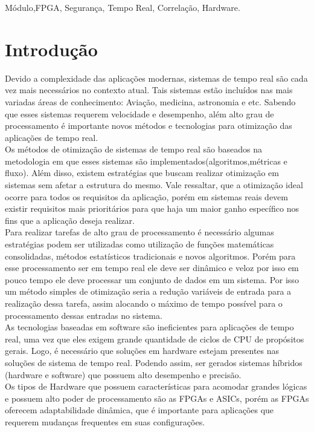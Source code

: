 \documentclass[conference]{IEEEtran}
\begin{document}
	
	\renewcommand{\IEEEkeywordsname}{Palavras-chave}
	\begin{IEEEkeywords}
		Módulo,FPGA, Segurança, Tempo Real, Correlação, Hardware.
	\end{IEEEkeywords}
	
	\section{Introdução}
	
	
Devido a complexidade das aplicações modernas, sistemas de tempo real são cada vez mais necessários no contexto atual. Tais sistemas estão incluídos nas mais variadas áreas de conhecimento: Aviação, medicina, astronomia e etc. Sabendo que esses sistemas requerem velocidade e desempenho, além alto grau de processamento é importante novos métodos e tecnologias para otimização das aplicações de tempo real.\\
Os métodos de otimização de sistemas de tempo real são baseados na metodologia em que esses sistemas são implementados(algoritmos,métricas e fluxo). Além disso, existem estratégias que buscam realizar otimização em sistemas sem afetar a estrutura do mesmo. Vale ressaltar, que a otimização ideal ocorre para todos os requisitos da aplicação, porém em sistemas reais devem existir requisitos mais prioritários para que haja um maior ganho específico nos fins que a aplicação deseja realizar.\\
Para realizar tarefas de alto grau de processamento é necessário algumas estratégias podem ser utilizadas como utilização de funções matemáticas consolidadas, métodos estatísticos tradicionais e novos algoritmos. Porém para esse processamento ser em tempo real ele deve ser dinâmico e veloz por isso em pouco tempo ele deve processar um conjunto de dados em um sistema. Por isso um método simples de otimização seria a redução variáveis de entrada para a realização dessa tarefa, assim alocando o máximo de tempo possível para o processamento dessas entradas no sistema.\\
As tecnologias baseadas em software são ineficientes para aplicações de tempo real, uma vez que eles exigem grande quantidade de ciclos de CPU de propósitos gerais. Logo, é necessário que soluções em hardware estejam presentes nas soluções de sistema de tempo real. Podendo assim, ser gerados sistemas híbridos (hardware e software) que possuem alto desempenho e precisão. \\
Os tipos de Hardware que possuem características para acomodar grandes lógicas e possuem alto poder de processamento são as FPGAs e ASICs, porém as FPGAs oferecem adaptabilidade dinâmica, que é importante para aplicações que requerem mudanças frequentes em suas configurações.
\end{document}
